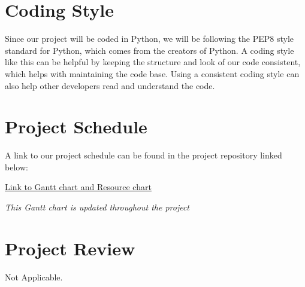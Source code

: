 \documentclass{article}
\begin{document}
\section{Coding Style}

Since our project will be coded in Python, we will be following the PEP8
style standard for Python, which comes from the creators of Python.
A coding style like this can be helpful by keeping the structure and look of
our code consistent, which helps with maintaining the code base. Using a
consistent coding style can also help other developers read and understand the
code.

\section{Project Schedule}
A link to our project schedule can be found in the project repository linked below:

\href{https://gitlab.cas.mcmaster.ca/jandricd/super-refactored-mario-bros/tree/master/ProjectSchedule}{Link to Gantt chart and Resource chart}

{\it This Gantt chart is updated throughout the project}


\section{Project Review}
Not Applicable.
\end{document}
